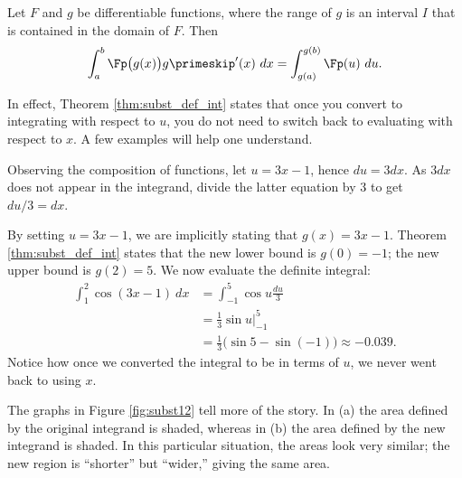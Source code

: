 {Let $F$ and $g$ be differentiable functions, where the range of $g$ is an interval $I$ that is contained in the domain of $F$. Then 
$$\int_a^b \Fp\big(g(x)\big)g\primeskip'(x)\ dx = \int_{g(a)}^{g(b)} \Fp(u)\ du.$$
}

In effect, Theorem \ref{thm:subst_def_int} states that once you convert to integrating with respect to $u$, you do not need to switch back to evaluating with respect to $x$. A few examples will help one understand.\\

{Observing the composition of functions, let $u=3x-1$, hence $du = 3dx$. As $3dx$ does not appear in the integrand, divide the latter equation by 3 to get $du/3 = dx$. 

By setting $u = 3x-1$, we are implicitly stating that $g(x) = 3x-1$. Theorem \ref{thm:subst_def_int} states that the new lower bound is $g(0) = -1$; the new upper bound is $g(2) = 5$. We now evaluate the definite integral:
\begin{align*}
\int_1^2 \cos(3x-1) \ dx &=	\int_{-1}^5 \cos u \frac{du}{3} \\
								&= \frac{1}{3} \sin u\Big|_{-1}^5 \\
								&= \frac{1}{3}\big(\sin 5- \sin (-1)\big)\approx -0.039.
\end{align*}
Notice how once we converted the integral to be in terms of $u$, we never went back to using $x$.

{%
}%
{%
}%

The graphs in Figure \ref{fig:subst12} tell more of the story. In (a) the area defined by the original integrand is shaded, whereas in (b) the area defined by the new integrand is shaded. In this particular situation, the areas look very similar; the new region is ``shorter'' but ``wider,'' giving the same area.
}\\


